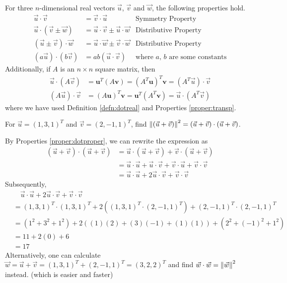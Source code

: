 \begin{proper}
\label{proper:dotproper}
For three $n$-dimensional real vectors $\vec{u}$, $\vec{v}$ and $\vec{w}$, the following properties hold.
\begin{align*}
\vec{u} \cdot \vec{v} &= \vec{v} \cdot \vec{u} &\text{Symmetry Property} \\
\vec{u} \cdot (\vec{v} \pm \vec{w}) &= \vec{u} \cdot \vec{v} \pm \vec{u} \cdot \vec{w} &\text{Distributive Property} \\
(\vec{u} \pm \vec{v}) \cdot \vec{w} &= \vec{u} \cdot \vec{w} \pm \vec{v} \cdot \vec{w} &\text{Distributive Property} \\
(a\vec{u}) \cdot (b\vec{v}) &= ab(\vec{u} \cdot \vec{v}) &\text{where $a$, $b$ are some constants}
\end{align*}
Additionally, if $A$ is an $n \times n$ square matrix, then
\begin{align*}
\vec{u} \cdot (A\vec{v}) &= \textbf{u}^T(A\textbf{v}) = (A^T\textbf{u})^T\textbf{v} = (A^T\vec{u}) \cdot \vec{v} \\
(A\vec{u}) \cdot \vec{v} &= (A\textbf{u})^T\textbf{v} = \textbf{u}^T(A^T\textbf{v}) = \vec{u} \cdot (A^T\vec{v})
\end{align*}
where we have used Definition \ref{defn:dotreal} and Properties \ref{proper:transp}.
\end{proper}
\begin{exmp}
For $\vec{u} = (1,3,1)^T$ and $\vec{v} = (2,-1,1)^T$, find $\norm{(\vec{u} + \vec{v})}^2 = (\vec{u} + \vec{v}) \cdot (\vec{u} + \vec{v})$.
\end{exmp}
\begin{solution}
By Properties \ref{proper:dotproper}, we can rewrite the expression as
\begin{align*}
(\vec{u} + \vec{v}) \cdot (\vec{u} + \vec{v}) &= \vec{u} \cdot (\vec{u} + \vec{v}) + \vec{v} \cdot (\vec{u} + \vec{v}) \\
&= \vec{u} \cdot \vec{u} + \vec{u} \cdot \vec{v} + \vec{v} \cdot \vec{u} + \vec{v} \cdot \vec{v} \\
&= \vec{u} \cdot \vec{u} + 2 \vec{u} \cdot \vec{v} + \vec{v} \cdot \vec{v}
\end{align*}
Subsequently,
\begin{align*}
&\quad \vec{u} \cdot \vec{u} + 2 \vec{u} \cdot \vec{v} + \vec{v} \cdot \vec{v} \\
&= (1,3,1)^T \cdot (1,3,1)^T + 2((1,3,1)^T \cdot (2,-1,1)^T) + (2,-1,1)^T \cdot (2,-1,1)^T \\
&= (1^2 + 3^2 + 1^2) + 2((1)(2)+(3)(-1)+(1)(1)) + (2^2 + (-1)^2 + 1^2) \\
&= 11 + 2(0) + 6 \\
&= 17
\end{align*}
Alternatively, one can calculate $\vec{w} = \vec{u} + \vec{v} = (1,3,1)^T + (2,-1,1)^T = (3,2,2)^T$ and find $\vec{w} \cdot \vec{w} = \norm{\vec{w}}^2$ instead. (which is easier and faster)
\end{solution}
